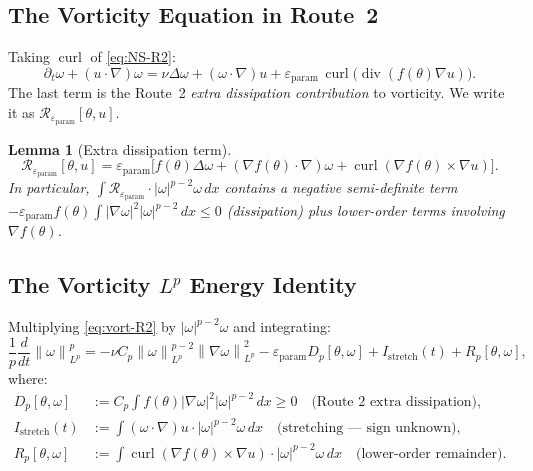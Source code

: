 \documentclass[11pt]{article}
\newtheorem{lemma}[theorem]{Lemma}
\theoremstyle{definition}
\theoremstyle{remark}
\newcommand{\dx}{\,dx}
\newcommand{\norm}[1]{\left\|#1\right\|}
\newcommand{\prt}{\partial_t}
\newcommand{\grad}{\nabla}
\newcommand{\divg}{\operatorname{div}}
\newcommand{\curl}{\operatorname{curl}}
\newcommand{\epsp}{\varepsilon_{\mathrm{param}}}
\begin{document}
\subsection{The Vorticity Equation in Route~2}

Taking $\curl$ of \eqref{eq:NS-R2}:
\begin{equation}\label{eq:vort-R2}
  \prt\omega + (u\cdot\grad)\omega
  = \nu\Delta\omega + (\omega\cdot\grad)u
  + \epsp\,\curl\bigl(\divg(f(\theta)\grad u)\bigr).
\end{equation}
The last term is the Route~2 \emph{extra dissipation contribution} to vorticity.
We write it as $\mathcal{R}_\epsp[\theta,u]$.

\begin{lemma}[Extra dissipation term]\label{lem:extra-dissip}
  \begin{equation}
    \mathcal{R}_\epsp[\theta,u]
    = \epsp\bigl[f(\theta)\Delta\omega + (\grad f(\theta)\cdot\grad)\omega
      + \curl(\grad f(\theta)\times\grad u)\bigr].
  \end{equation}
  In particular, $\int\mathcal{R}_\epsp\cdot|\omega|^{p-2}\omega\dx$
  contains a negative semi-definite term $-\epsp f(\theta)\int|\grad\omega|^2|\omega|^{p-2}\dx\leq 0$
  (dissipation) plus lower-order terms involving $\grad f(\theta)$.
\end{lemma}

\subsection{The Vorticity $L^p$ Energy Identity}

Multiplying \eqref{eq:vort-R2} by $|\omega|^{p-2}\omega$ and integrating:
\begin{equation}\label{eq:vort-Lp-identity}
  \frac{1}{p}\frac{d}{dt}\norm{\omega}^p_{L^p}
  = -\nu C_p\norm{\omega}^{p-2}_{L^p}\norm{\grad\omega}^2_{L^p}
    - \epsp D_p[\theta,\omega]
    + I_{\mathrm{stretch}}(t)
    + R_p[\theta,\omega],
\end{equation}
where:
\begin{align*}
  D_p[\theta,\omega] &:= C_p\int f(\theta)|\grad\omega|^2|\omega|^{p-2}\dx \geq 0
    \quad\text{(Route~2 extra dissipation)},\\
  I_{\mathrm{stretch}}(t) &:= \int(\omega\cdot\grad)u\cdot|\omega|^{p-2}\omega\dx
    \quad\text{(stretching --- sign unknown)},\\
  R_p[\theta,\omega] &:= \int\curl(\grad f(\theta)\times\grad u)\cdot|\omega|^{p-2}\omega\dx
    \quad\text{(lower-order remainder)}.
\end{align*}
\end{document}
